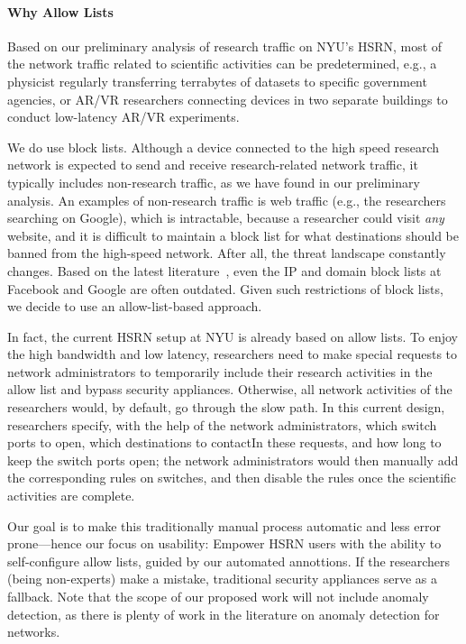 \paragraph{Why Allow Lists}
Based on our preliminary analysis of research traffic on NYU's HSRN, most of the network traffic related to scientific activities can be predetermined, e.g., a physicist regularly transferring terrabytes of datasets to specific government agencies, or AR/VR researchers connecting devices in two separate buildings to conduct low-latency AR/VR experiments.

We do use block lists. Although a device connected to the high speed research network is expected to send and receive research-related network traffic, it typically includes non-research traffic, as we have found in our preliminary analysis. An examples of non-research traffic is web traffic (e.g., the researchers searching on Google), which is intractable, because a researcher could visit \textit{any} website, and it is difficult to maintain a block list for what destinations should be banned from the high-speed network. After all, the threat landscape constantly changes. Based on the latest literature~\cite{235461}, even the IP and domain block lists at Facebook and Google are often outdated. Given such restrictions of block lists, we decide to use an allow-list-based approach.

In fact, the current HSRN setup at NYU is already based on allow lists. To enjoy the high bandwidth and low latency, researchers need to make special requests to network administrators to temporarily include their research activities in the allow list and bypass security appliances. Otherwise, all network activities of the researchers would, by default, go through the slow path. In this current design, researchers specify, with the help of the network administrators, which switch ports to open, which destinations to contactIn these requests, and how long to keep the switch ports open; the network administrators would then manually add the corresponding rules on switches, and then disable the rules once the scientific activities are complete.

Our goal is to make this traditionally manual process automatic and less error prone---hence our focus on usability: Empower HSRN users with the ability to self-configure allow lists, guided by our automated annottions. If the researchers (being non-experts) make a mistake, traditional security appliances serve as a fallback. Note that the scope of our proposed work will not include anomaly detection, as there is plenty of work in the literature on anomaly detection for networks.


